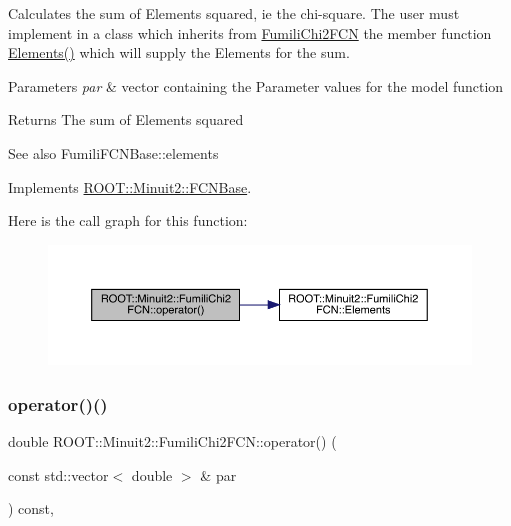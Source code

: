 Calculates the sum of Elements squared, ie the chi-\/square. The user must implement in a class which inherits from \mbox{\hyperlink{classROOT_1_1Minuit2_1_1FumiliChi2FCN}{Fumili\+Chi2\+F\+CN}} the member function \mbox{\hyperlink{classROOT_1_1Minuit2_1_1FumiliChi2FCN_a25cc8dcc2eff831b3c0a94bf5413c2cd}{Elements()}} which will supply the Elements for the sum.


\begin{DoxyParams}{Parameters}
{\em par} & vector containing the Parameter values for the model function\\
\hline
\end{DoxyParams}
\begin{DoxyReturn}{Returns}
The sum of Elements squared
\end{DoxyReturn}
\begin{DoxySeeAlso}{See also}
Fumili\+F\+C\+N\+Base\+::elements 
\end{DoxySeeAlso}


Implements \mbox{\hyperlink{classROOT_1_1Minuit2_1_1FCNBase_ae4a86bd94d0d0f5ca6fc8f8ab2bb43cd}{R\+O\+O\+T\+::\+Minuit2\+::\+F\+C\+N\+Base}}.

Here is the call graph for this function\+:
\nopagebreak
\begin{figure}[H]
\begin{center}
\leavevmode
\includegraphics[width=350pt]{d3/df0/classROOT_1_1Minuit2_1_1FumiliChi2FCN_ae7b2c2080162c0b946cf54090b712716_cgraph}
\end{center}
\end{figure}
\mbox{\label{classROOT_1_1Minuit2_1_1FumiliChi2FCN_ae7b2c2080162c0b946cf54090b712716}} 
\subsubsection{\texorpdfstring{operator()()}{operator()()}\hspace{0.1cm}{\footnotesize\ttfamily [3/3]}}
{\footnotesize\ttfamily double R\+O\+O\+T\+::\+Minuit2\+::\+Fumili\+Chi2\+F\+C\+N\+::operator() (\begin{DoxyParamCaption}\item[{const std\+::vector$<$ double $>$ \&}]{par }\end{DoxyParamCaption}) const\hspace{0.3cm}{\ttfamily [inline]}, {\ttfamily [virtual]}}

